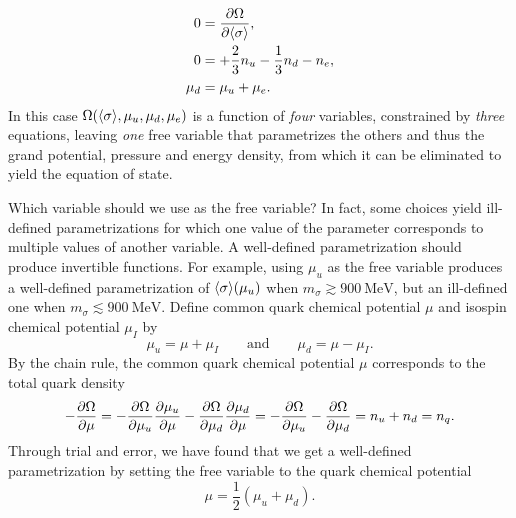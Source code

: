 \begin{subequations}
\begin{align}
	0 &= \pdv{\Omega}{ \langle \sigma \rangle} , \label{eq:lsm:minsys_min} \\
	0 &= +\frac23 n_u - \frac13 n_d - n_e , \label{eq:lsm:minsys_charge} \\
	\mu_d &= \mu_u + \mu_e . \label{eq:lsm:minsys_equilibrium}
\end{align}%
\label{eq:lsm:minsys}%
\end{subequations}%
In this case $\Omega(\langle \sigma \rangle,\mu_u,\mu_d,\mu_e)$ is a function of \emph{four} variables,
constrained by \emph{three} equations,
leaving \emph{one} free variable that parametrizes the others and thus the grand potential, pressure and energy density,
from which it can be eliminated to yield the equation of state.


Which variable should we use as the free variable?
In fact, some choices yield ill-defined parametrizations for which one value of the parameter corresponds to multiple values of another variable.
A well-defined parametrization should produce invertible functions.
For example, using $\mu_u$ as the free variable produces a well-defined parametrization of $\langle \sigma \rangle(\mu_u)$ when $m_\sigma \gtrsim \SI{900}{\mega\electronvolt}$, but an ill-defined one when $m_\sigma \lesssim \SI{900}{\mega\electronvolt}$.
Define common quark chemical potential $\mu$ and isospin chemical potential $\mu_I$ by
\begin{equation}
	\mu_u = \mu + \mu_I
	\qquad \text{and} \qquad
	\mu_d = \mu - \mu_I .
\label{eq:lsm:quark_chemical_potential}
\end{equation}
By the chain rule, the common quark chemical potential $\mu$ corresponds to the total quark density
\begin{equation}
	-\pdv{\Omega}{\mu} = -\pdv{\Omega}{\mu_u} \pdv{\mu_u}{\mu} - \pdv{\Omega}{\mu_d} \pdv{\mu_d}{\mu} = -\pdv{\Omega}{\mu_u} - \pdv{\Omega}{\mu_d} = n_u + n_d = n_q .
\end{equation}
Through trial and error, we have found that we get a well-defined parametrization by setting the free variable to the quark chemical potential
\begin{equation}
	\mu = \frac12 (\mu_u + \mu_d) .
\end{equation}

